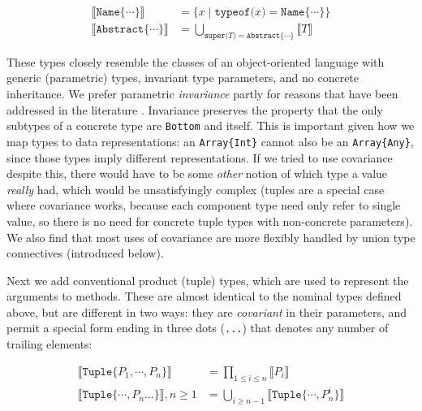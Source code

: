 \vspace{-3ex}
\begin{align*}
  \llbracket \texttt{Name\{}\cdots\texttt{\}} \rrbracket &= \{ x\mid \texttt{typeof(}x\texttt{)} = \texttt{Name\{}\cdots\texttt{\}} \} \\
  \llbracket \texttt{Abstract\{}\cdots\texttt{\}} \rrbracket &= \bigcup_{\texttt{super(}T\texttt{)} = \texttt{Abstract\{}\cdots\texttt{\}}} \llbracket T \rrbracket
\end{align*}

These types closely resemble the classes of an object-oriented language with
generic (parametric) types, invariant type parameters, and no concrete inheritance.
We prefer parametric \emph{invariance} partly for reasons that have been addressed in the
literature \cite{Day:1995:SVC:217838.217852}.
Invariance preserves the property that the only subtypes of a concrete type are \texttt{Bottom}
and itself.
This is important given how we map types to data representations: an \texttt{Array\{Int\}}
cannot also be an \texttt{Array\{Any\}}, since those types imply different
representations.
If we tried to use covariance despite this, there would have to be some \emph{other}
notion of which type a value \emph{really} had, which would be unsatisfyingly
complex
(tuples are a special case where covariance works, because each component type need
only refer to single value, so there is no need for concrete
tuple types with non-concrete parameters).
We also find that most uses of covariance are more flexibly
handled by union type connectives (introduced below).

Next we add conventional product (tuple) types, which are used to represent the
arguments to methods. These are almost identical to the nominal types defined above,
but are different in two ways: they are \emph{covariant} in their parameters, and permit
a special form ending in three dots (\texttt{...}) that denotes any number of trailing
elements:

\vspace{-3ex}
\begin{align*}
  \llbracket \texttt{Tuple\{}P_1,\cdots,P_n\texttt{\}} \rrbracket &= \prod_{1\leq i \leq n} \llbracket P_i \rrbracket \\
  \llbracket \texttt{Tuple\{}\cdots,P_n\texttt{...\}} \rrbracket, n\geq 1 &= \bigcup_{i\geq n-1} \llbracket \texttt{Tuple\{}\cdots,P_n^i\texttt{\}} \rrbracket
\end{align*}

